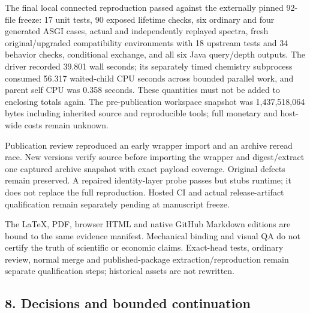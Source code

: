\documentclass[
  10pt,
]{article}
\begin{document}
The final local connected reproduction passed against the externally
pinned 92-file freeze: 17 unit tests, 90 exposed lifetime checks, six
ordinary and four generated ASGI cases, actual and independently
replayed spectra, fresh original/upgraded compatibility environments
with 18 upstream tests and 34 behavior checks, conditional exchange, and
all six Java query/depth outputs. The driver recorded 39.801 wall
seconds; its separately timed chemistry subprocess consumed 56.317
waited-child CPU seconds across bounded parallel work, and parent self
CPU was 0.358 seconds. These quantities must not be added to enclosing
totals again. The pre-publication workspace snapshot was 1,437,518,064
bytes including inherited source and reproducible tools; full monetary
and host-wide costs remain unknown.

Publication review reproduced an early wrapper import and an archive
reread race. New versions verify source before importing the wrapper and
digest/extract one captured archive snapshot with exact payload
coverage. Original defects remain preserved. A repaired identity-layer
probe passes but stubs runtime; it does not replace the full
reproduction. Hosted CI and actual release-artifact qualification remain
separately pending at manuscript freeze.

The LaTeX, PDF, browser HTML and native GitHub Markdown editions are
bound to the same evidence manifest. Mechanical binding and visual QA do
not certify the truth of scientific or economic claims. Exact-head
tests, ordinary review, normal merge and published-package
extraction/reproduction remain separate qualification steps; historical
assets are not rewritten.

\hypertarget{decisions-and-bounded-continuation}{%
\subsection{8. Decisions and bounded
continuation}\label{decisions-and-bounded-continuation}}
\end{document}
